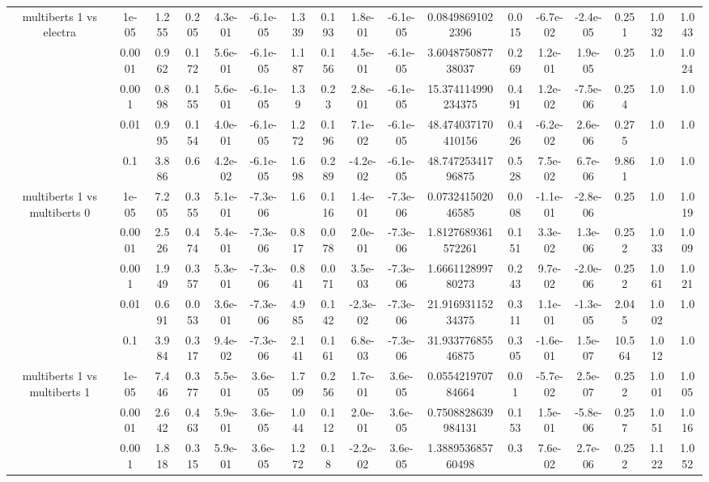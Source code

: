 \begin{tabular}{|c|c|c|c|c|c|c|c|c|c|c|c|c|c|c|c|c|}
\hline
\multirow{5}{*}{multiberts 1 vs electra } & 1e-05 & 1.255 & 0.205 & 4.3e-01 & -6.1e-05 & 1.339 & 0.193 & 1.8e-01 & -6.1e-05 & 0.08498691022396 & 0.015 & -6.7e-02 & -2.4e-05 & 0.251 & 1.032 & 1.043 \\
 & 0.0001 & 0.962 & 0.172 & 5.6e-01 & -6.1e-05 & 1.187 & 0.156 & 4.5e-01 & -6.1e-05 & 3.604875087738037 & 0.269 & 1.2e-01 & 1.9e-05 & 0.25 & 1.0 & 1.024 \\
 & 0.001 & 0.898 & 0.155 & 5.6e-01 & -6.1e-05 & 1.39 & 0.23 & 2.8e-01 & -6.1e-05 & 15.374114990234375 & 0.491 & 1.2e-02 & -7.5e-06 & 0.254 & 1.0 & 1.0 \\
 & 0.01 & 0.995 & 0.154 & 4.0e-01 & -6.1e-05 & 1.272 & 0.196 & 7.1e-02 & -6.1e-05 & 48.474037170410156 & 0.426 & -6.2e-02 & 2.6e-06 & 0.275 & 1.0 & 1.0 \\
 & 0.1 & 3.886 & 0.6 & 4.2e-02 & -6.1e-05 & 1.698 & 0.289 & -4.2e-02 & -6.1e-05 & 48.74725341796875 & 0.528 & 7.5e-02 & 6.7e-06 & 9.861 & 1.0 & 1.0 \\
\hline
\multirow{5}{*}{multiberts 1 vs multiberts 0} & 1e-05 & 7.205 & 0.355 & 5.1e-01 & -7.3e-06 & 1.6 & 0.116 & 1.4e-01 & -7.3e-06 & 0.073241502046585 & 0.008 & -1.1e-01 & -2.8e-06 & 0.25 & 1.0 & 1.019 \\
 & 0.0001 & 2.526 & 0.474 & 5.4e-01 & -7.3e-06 & 0.817 & 0.078 & 2.0e-01 & -7.3e-06 & 1.8127689361572261 & 0.151 & 3.3e-02 & 1.3e-06 & 0.252 & 1.033 & 1.009 \\
 & 0.001 & 1.949 & 0.357 & 5.3e-01 & -7.3e-06 & 0.841 & 0.071 & 3.5e-03 & -7.3e-06 & 1.666112899780273 & 0.243 & 9.7e-02 & -2.0e-06 & 0.252 & 1.061 & 1.021 \\
 & 0.01 & 0.691 & 0.053 & 3.6e-01 & -7.3e-06 & 4.985 & 0.142 & -2.3e-02 & -7.3e-06 & 21.91693115234375 & 0.311 & 1.1e-01 & -1.3e-05 & 2.045 & 1.002 & 1.0 \\
 & 0.1 & 3.984 & 0.317 & 9.4e-02 & -7.3e-06 & 2.141 & 0.161 & 6.8e-03 & -7.3e-06 & 31.93377685546875 & 0.305 & -1.6e-01 & 1.5e-07 & 10.564 & 1.012 & 1.0 \\
\hline
\multirow{5}{*}{multiberts 1 vs multiberts 1} & 1e-05 & 7.446 & 0.377 & 5.5e-01 & 3.6e-05 & 1.709 & 0.256 & 1.7e-01 & 3.6e-05 & 0.055421970784664 & 0.01 & -5.7e-02 & 2.5e-07 & 0.252 & 1.001 & 1.005 \\
 & 0.0001 & 2.642 & 0.463 & 5.9e-01 & 3.6e-05 & 1.044 & 0.112 & 2.0e-01 & 3.6e-05 & 0.7508828639984131 & 0.153 & 1.5e-01 & -5.8e-06 & 0.257 & 1.051 & 1.016 \\
 & 0.001 & 1.818 & 0.315 & 5.9e-01 & 3.6e-05 & 1.272 & 0.18 & -2.2e-02 & 3.6e-05 & 1.388953685760498 & 0.3 & 7.6e-02 & 2.7e-06 & 0.252 & 1.122 & 1.052 \\

\end{tabular}
